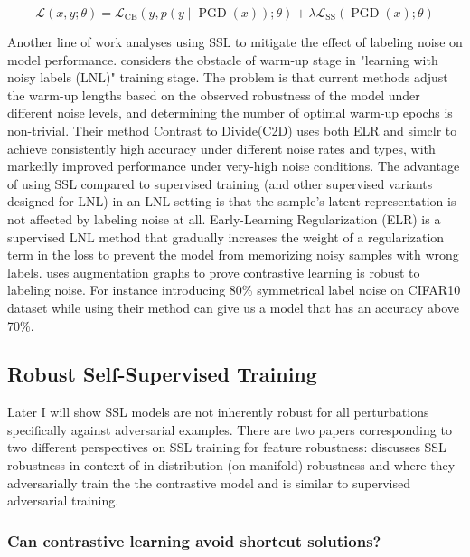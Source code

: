 \documentclass[../thesis.tex]{subfiles}
\begin{document}
	\begin{equation}
	\label{eqn:adv_loss_SSL_loss}
		\mathcal{L}(x, y ; \theta)=\mathcal{L}_{\mathrm{CE}}(y, p(y \mid \operatorname{PGD}(x)) ; \theta)+\lambda \mathcal{L}_{\mathrm{SS}}(\operatorname{PGD}(x) ; \theta)
	\end{equation}
	
	Another line of work analyses using SSL to mitigate the effect of labeling noise on model performance. \cite{contrast_to_divide} considers the obstacle of warm-up stage in "learning with noisy labels (LNL)" training stage. The problem is that current methods adjust the warm-up lengths based on the observed robustness of the model under different noise levels, and determining the number of optimal warm-up epochs is non-trivial. Their method Contrast to Divide(C2D) uses both ELR and simclr to achieve consistently high accuracy under different noise rates and types, with markedly improved performance under very-high noise conditions. The advantage of using SSL compared to supervised training (and other supervised variants designed for LNL)  in an LNL setting is that the sample's latent representation is not affected by labeling noise at all. Early-Learning Regularization (ELR) \cite{ELR} is a supervised LNL method that gradually increases the weight of a regularization term in the loss to prevent the model from memorizing noisy samples with wrong labels. \cite{label_noise_contrastive_learning} uses augmentation graphs to prove contrastive learning is robust to labeling noise. For instance introducing 80\% symmetrical label noise on CIFAR10 dataset while using their method can give us a model that has an accuracy above 70\%.  
	
	\subsection{Robust Self-Supervised Training}
	
	Later I will show SSL models are not inherently robust for all perturbations specifically against adversarial examples. There are two papers corresponding to two different perspectives on SSL training for feature robustness: \cite{ifm_ssl_avoid_shortcuts} discusses SSL robustness in context of in-distribution (on-manifold) robustness and \cite{ACL_Adversarial_Contrastive_Learning_2020} where they adversarially train the the contrastive model and is similar to supervised adversarial training. 
	
	\subsubsection{Can contrastive learning avoid shortcut solutions?}
	\label{sec:ifm_ssl_shortcuts}
	
\end{document}
